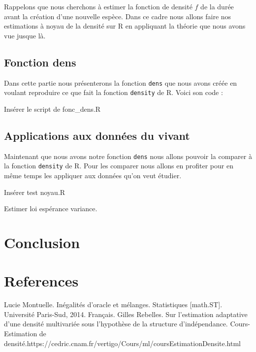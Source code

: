 \documentclass[
]{book}
\begin{document}
Rappelons que nous cherchons à estimer la fonction de densité \(f\) de la durée avant la création d'une nouvelle espèce. Dans ce cadre nous allons faire nos estimations à noyau de la densité sur R en appliquant la théorie que nous avons vue jusque là.

\hypertarget{fonction-dens}{%
\section{Fonction dens}\label{fonction-dens}}

Dans cette partie nous présenterons la fonction \texttt{dens} que nous avons créée en voulant reproduire ce que fait la fonction \texttt{density} de R.
Voici son code :

Insérer le script de fonc\_dens.R

\hypertarget{applications-aux-donnuxe9es-du-vivant}{%
\section{Applications aux données du vivant}\label{applications-aux-donnuxe9es-du-vivant}}

Maintenant que nous avons notre fonction \texttt{dens} nous allons pouvoir la comparer à la fonction \texttt{density} de R. Pour les comparer nous allons en profiter pour en même temps les appliquer aux données qu'on veut étudier.

Insérer test noyau.R

Estimer loi espérance variance.

\hypertarget{conclusion}{%
\chapter{Conclusion}\label{conclusion}}

\hypertarget{references}{%
\chapter{References}\label{references}}

\label{eq:oracle} Lucie Montuelle. Inégalités d'oracle et mélanges. Statistiques {[}math.ST{]}. Université Paris-Sud, 2014.
Français.\newline
\label{eq:est-ad} Gilles Rebelles. Sur l'estimation adaptative d'une densité multivariée sous l'hypothèse de la structure d'indépendance.\newline
\label{eq:cours-est} Cours-Estimation de densité.https://cedric.cnam.fr/vertigo/Cours/ml/coursEstimationDensite.html\newline

  
\end{document}
